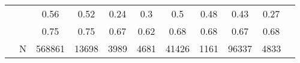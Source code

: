 \begin{table}[ht]
\begin{tabular}{l>{\raggedright\arraybackslash}p{3.2cm}|ccccccccc}
   & \multicolumn{1}{>{\raggedleft\arraybackslash}p{2.9cm}|}{\makebox[2.9cm][r]{Lives with Child }} & 0.56 & 0.52 & 0.24 & 0.3 & 0.5 & 0.48 & 0.43 & 0.27 \\ 
   & \multicolumn{1}{>{\raggedleft\arraybackslash}p{3.4cm}|}{\makebox[3.4cm][r]{Married/Cohabiting }} & 0.75 & 0.75 & 0.67 & 0.62 & 0.68 & 0.68 & 0.67 & 0.68 \\ 
   & N & 568861 & 13698 & 3989 & 4681 & 41426 & 1161 & 96337 & 4833 \\ 
   \hline
\end{tabular}
\endgroup
\end{table}
